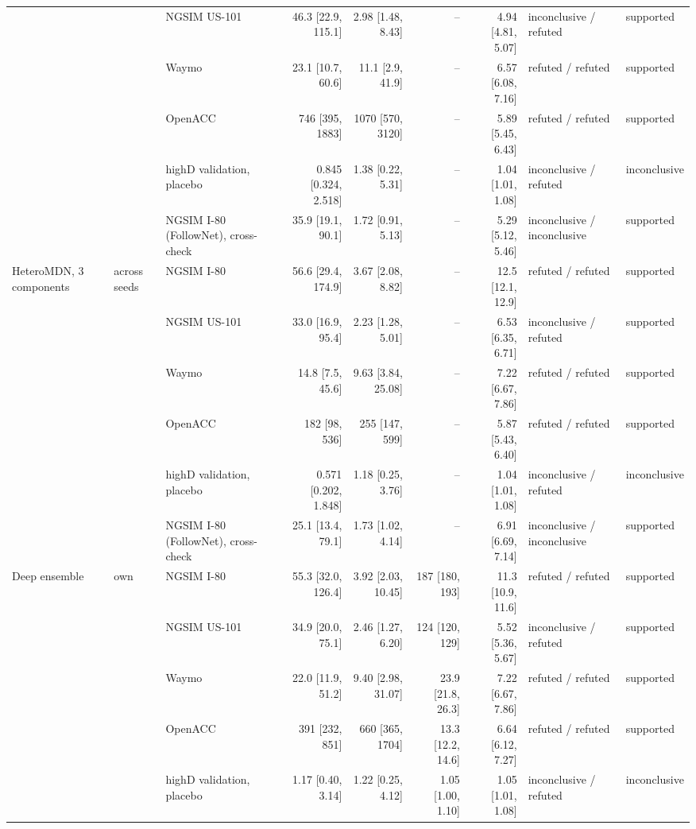 \begin{longtable}{lllrrrrll}
 &  & NGSIM US-101 & 46.3 [22.9, 115.1] & 2.98 [1.48, 8.43] & -- & 4.94 [4.81, 5.07] & inconclusive / refuted & supported \\
 &  & Waymo & 23.1 [10.7, 60.6] & 11.1 [2.9, 41.9] & -- & 6.57 [6.08, 7.16] & refuted / refuted & supported \\
 &  & OpenACC & 746 [395, 1883] & 1070 [570, 3120] & -- & 5.89 [5.45, 6.43] & refuted / refuted & supported \\
 &  & highD validation, placebo & 0.845 [0.324, 2.518] & 1.38 [0.22, 5.31] & -- & 1.04 [1.01, 1.08] & inconclusive / refuted & inconclusive \\
 &  & NGSIM I-80 (FollowNet), cross-check & 35.9 [19.1, 90.1] & 1.72 [0.91, 5.13] & -- & 5.29 [5.12, 5.46] & inconclusive / inconclusive & supported \\
\midrule
HeteroMDN, 3 components & across seeds & NGSIM I-80 & 56.6 [29.4, 174.9] & 3.67 [2.08, 8.82] & -- & 12.5 [12.1, 12.9] & refuted / refuted & supported \\
 &  & NGSIM US-101 & 33.0 [16.9, 95.4] & 2.23 [1.28, 5.01] & -- & 6.53 [6.35, 6.71] & inconclusive / refuted & supported \\
 &  & Waymo & 14.8 [7.5, 45.6] & 9.63 [3.84, 25.08] & -- & 7.22 [6.67, 7.86] & refuted / refuted & supported \\
 &  & OpenACC & 182 [98, 536] & 255 [147, 599] & -- & 5.87 [5.43, 6.40] & refuted / refuted & supported \\
 &  & highD validation, placebo & 0.571 [0.202, 1.848] & 1.18 [0.25, 3.76] & -- & 1.04 [1.01, 1.08] & inconclusive / refuted & inconclusive \\
 &  & NGSIM I-80 (FollowNet), cross-check & 25.1 [13.4, 79.1] & 1.73 [1.02, 4.14] & -- & 6.91 [6.69, 7.14] & inconclusive / inconclusive & supported \\
\midrule
Deep ensemble & own & NGSIM I-80 & 55.3 [32.0, 126.4] & 3.92 [2.03, 10.45] & 187 [180, 193] & 11.3 [10.9, 11.6] & refuted / refuted & supported \\
 &  & NGSIM US-101 & 34.9 [20.0, 75.1] & 2.46 [1.27, 6.20] & 124 [120, 129] & 5.52 [5.36, 5.67] & inconclusive / refuted & supported \\
 &  & Waymo & 22.0 [11.9, 51.2] & 9.40 [2.98, 31.07] & 23.9 [21.8, 26.3] & 7.22 [6.67, 7.86] & refuted / refuted & supported \\
 &  & OpenACC & 391 [232, 851] & 660 [365, 1704] & 13.3 [12.2, 14.6] & 6.64 [6.12, 7.27] & refuted / refuted & supported \\
 &  & highD validation, placebo & 1.17 [0.40, 3.14] & 1.22 [0.25, 4.12] & 1.05 [1.00, 1.10] & 1.05 [1.01, 1.08] & inconclusive / refuted & inconclusive \\

\end{longtable}

